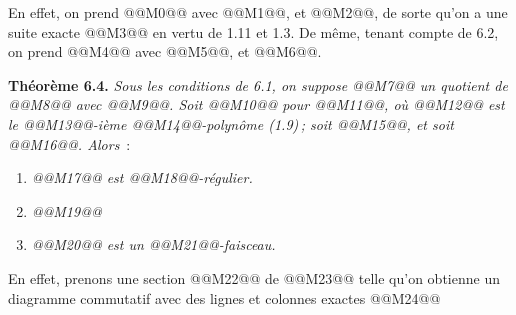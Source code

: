 
En
effet, on prend @@M0@@ avec @@M1@@, et @@M2@@, de sorte qu'on a une suite exacte
@@M3@@
en vertu de 1.11 et 1.3. De m\^eme, tenant compte de 6.2, on prend @@M4@@ avec @@M5@@, et @@M6@@.

\textbf{Th\'eor\`eme 6.4.} \emph{Sous les conditions de 6.1, on suppose @@M7@@ un quotient de @@M8@@ avec @@M9@@. Soit @@M10@@ pour @@M11@@, o\`u @@M12@@ est le @@M13@@-i\`eme @@M14@@-polyn\^ome (1.9)\,; soit @@M15@@, et soit @@M16@@. Alors}~:
\begin{enumerate}[label=(\roman*)]
\item \emph{@@M17@@ est @@M18@@-r\'egulier.}
\item \emph{@@M19@@}
\item \emph{@@M20@@ est un @@M21@@-faisceau.}
\end{enumerate}

En effet, prenons une section @@M22@@ de @@M23@@ telle qu'on obtienne un diagramme commutatif avec des lignes et colonnes exactes
@@M24@@
